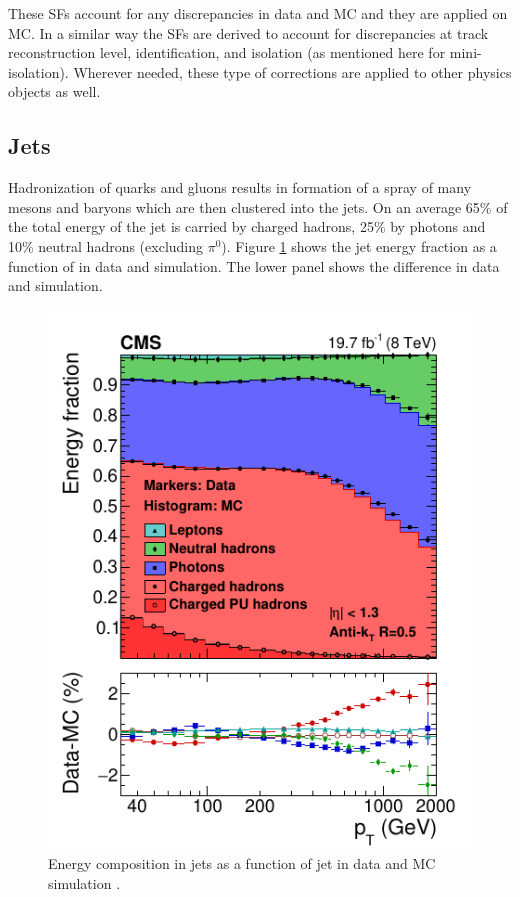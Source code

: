 These SFs account for any discrepancies in data and MC and they are applied on MC. In a similar way the SFs are derived to account for 
discrepancies at track reconstruction level, identification, and isolation (as mentioned here for mini-isolation). Wherever needed, these 
type of corrections are applied to other physics objects as well. 

 

\subsection{Jets}
Hadronization of quarks and gluons results in formation of a spray of many mesons and baryons which are then clustered into the jets. On an average 65\% of the total energy of the jet is carried by charged hadrons, 25\% by photons and 10\% neutral hadrons (excluding $\pi^{0}$). 
Figure \ref{fig:JetEfrac} shows the jet energy fraction as a function of \pt in data and simulation. The lower panel shows the difference 
in data and simulation.
\begin{figure}[h!]
\centering
\includegraphics[width=0.5\linewidth]{../Figures/Chap2/JetEfrac}
\caption[Energy energy composition]{Energy composition in jets as a function of jet \pt in data and MC simulation \cite{CMS-PRF-14-001}.}
\label{fig:JetEfrac}
\end{figure}


